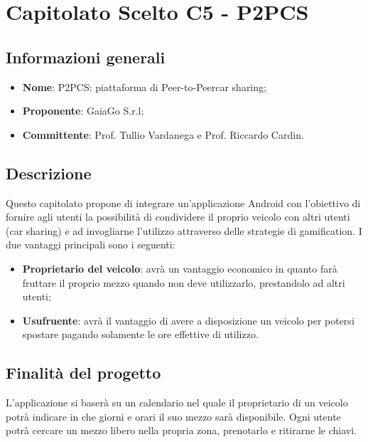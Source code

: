 \section{Capitolato Scelto C5 - P2PCS}
\subsection{Informazioni generali}
\begin{itemize}
\item \textbf{Nome}: P2PCS: piattaforma di Peer-to-Peer\glosp car sharing;
\item \textbf{Proponente}: GaiaGo S.r.l;
\item \textbf{Committente}: Prof. Tullio Vardanega e Prof. Riccardo Cardin.
\end{itemize}
\subsection{Descrizione}
Questo capitolato propone di integrare un'applicazione Android con l'obiettivo di fornire agli utenti la possibilità di condividere il proprio veicolo con altri utenti (car sharing) e ad invogliarne l'utilizzo attraverso delle strategie di gamification\glosp. 
I due vantaggi principali sono i seguenti:
\begin{itemize}
	\item \textbf{Proprietario del veicolo}: avrà un vantaggio economico in quanto farà fruttare il proprio mezzo quando non deve utilizzarlo, prestandolo ad altri utenti;
	\item \textbf{Usufruente}: avrà il vantaggio di avere a disposizione un veicolo per potersi spostare pagando solamente le ore effettive di utilizzo.
\end{itemize}
\subsection{Finalità del progetto}
L'applicazione si baserà su un calendario nel quale il proprietario di un veicolo potrà indicare in che giorni e orari il suo mezzo sarà disponibile. Ogni utente potrà cercare un mezzo libero nella propria zona, prenotarlo e ritirarne le chiavi.
